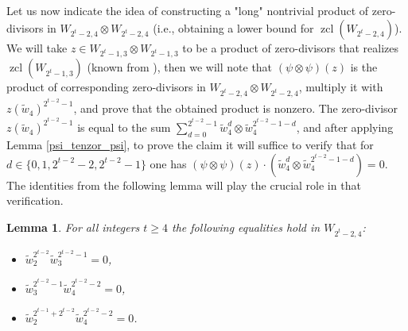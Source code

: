 \documentclass{amsart}
\newtheorem{lemma}[theorem]{Lemma}
\theoremstyle{definition}
\theoremstyle{remark}
\numberwithin{equation}{section}
\newcommand{\w}{\widetilde w}
\newcommand{\zcl}{\operatorname{zcl}}
\renewcommand{\ge}{\geqslant}
\begin{document}
Let us now indicate the idea of constructing a "long" nontrivial product of zero-divisors in $W_{2^t-2,4}\otimes W_{2^t-2,4}$ (i.e., obtaining a lower bound for $\zcl(W_{2^t-2,4})$). We will take $z\in W_{2^t-1,3}\otimes W_{2^t-1,3}$ to be a product of zero-divisors that realizes $\zcl(W_{2^t-1,3})$ (known from \cite{CPR}), then we will note that $(\psi\otimes\psi)(z)$ is the product of corresponding zero-divisors in $W_{2^t-2,4}\otimes W_{2^t-2,4}$, multiply it with $z(\w_4)^{2^{t-2}-1}$, and prove that the obtained product is nonzero. The zero-divisor $z(\w_4)^{2^{t-2}-1}$ is equal to the sum $\sum_{d=0}^{2^{t-2}-1}\w_4^d\otimes\w_4^{2^{t-2}-1-d}$, and after applying Lemma \ref{psi_tenzor_psi}, to prove the claim it will suffice to verify that for $d\in\{0,1,2^{t-2}-2,2^{t-2}-1\}$ one has $(\psi\otimes\psi)(z)\cdot(\w_4^d\otimes\w_4^{2^{t-2}-1-d})=0$. The identities from the following lemma will play the crucial role in that verification.

\begin{lemma}\label{identiteti:2^t-2}
    For all integers $t\ge4$ the following equalities hold in $W_{2^t-2,4}$:
    \begin{itemize}
        \item[(a)] $\w_2^{2^{t-2}}\w_3^{2^{t-2}-1}=0$, 
        \item[(b)] $\w_3^{2^{t-2}-1}\w_4^{2^{t-2}-2}=0$, 
        \item[(c)] $\w_2^{2^{t-1} + 2^{t-2}
        }\w_4^{2^{t-2}-2} = 0$.
    \end{itemize}
\end{lemma}
\end{document}
